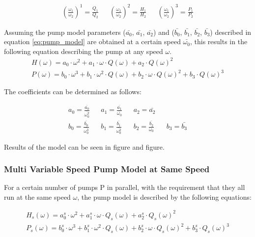 \begin{align}
	\left(\frac{\omega_1}{\omega_2}\right)^1 = \frac{Q_1}{Q_2} && 
	\left(\frac{\omega_1}{\omega_2}\right)^2 = \frac{H_1}{H_2} &&
	\left(\frac{\omega_1}{\omega_2}\right)^3 = \frac{P_1}{P_2}	
\end{align}

\newpage
Assuming the pump model parameters ($\bar{a_{0}}$, $\bar{a_{1}}$, $\bar{a_{2}}$) and ($\bar{b_{0}}$, $\bar{b_{1}}$, $\bar{b_{2}}$, $\bar{b_{3}}$) 
described in equation \ref{eq:pump_model} are obtained at a certain speed $\bar{\omega_{0}}$, 
this results in the following equation describing the pump at any speed $\omega$.
\begin{equation}
	\begin{aligned}
	H(\omega) = a_0 \cdot \omega^2 + a_1 \cdot \omega \cdot Q(\omega) + a_2 \cdot Q(\omega)^2 \\
	P(\omega) = b_0 \cdot \omega^3 + b_1 \cdot \omega^2 \cdot Q(\omega) + b_2 \cdot \omega \cdot Q(\omega)^2 + b_3 \cdot Q(\omega)^3
	\end{aligned}
\end{equation}

The coefficients can be determined as follows:

\begin{align*}
	a_0 = \frac{\bar{a_0}}{\bar{\omega_0^2}} && a_1 = \frac{\bar{a_1}}{\bar{\omega_0}} && a_2 = \bar{a_2} \\
	b_0 = \frac{\bar{b_0}}{\bar{\omega_0^3}} && b_1 = \frac{\bar{b_1}}{\bar{\omega_0^2}} && b_2 = \frac{\bar{b_2}}{\omega_0} && b_3 = \bar{b_3}
\end{align*}

Results of the model can be seen in figure and figure.
\subsubsection{Multi Variable Speed Pump Model at Same Speed}
For a certain number of pumps P in parallel, with the requirement that they all run at the same speed $\omega$, the pump model is
described by the following equations:

\begin{equation}
	\begin{aligned}
	H_s(\omega) = a_0^s \cdot \omega^2 + a_1^s \cdot \omega \cdot Q_s(\omega) + a_2^s \cdot Q_s(\omega)^2 \\
	P_s(\omega) = b_0^s \cdot \omega^3 + b_1^s \cdot \omega^2 \cdot Q_s(\omega) + b_2^s \cdot \omega \cdot Q_s(\omega)^2 + b_3^s \cdot Q_s(\omega)^3
	\end{aligned}
\end{equation}

